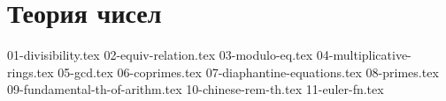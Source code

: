 \section{Теория чисел}
{01-divisibility.tex}
{02-equiv-relation.tex}
{03-modulo-eq.tex}
{04-multiplicative-rings.tex}
{05-gcd.tex}
{06-coprimes.tex}
{07-diaphantine-equations.tex}
{08-primes.tex}
{09-fundamental-th-of-arithm.tex}
{10-chinese-rem-th.tex}
{11-euler-fn.tex}
